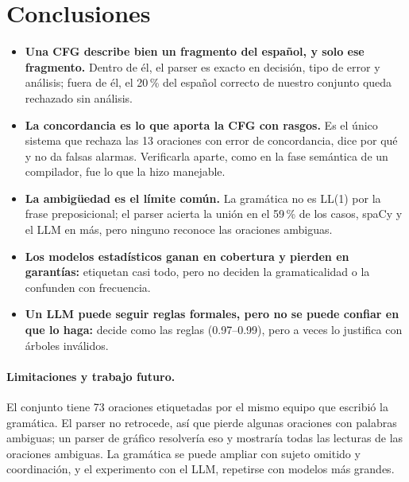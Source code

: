 \section{Conclusiones}
\label{sec:conclusiones}

\begin{itemize}
  \item \textbf{Una CFG describe bien un fragmento del español, y solo ese fragmento.} Dentro de
    él, el parser es exacto en decisión, tipo de error y análisis; fuera de él, el 20\,\% del
    español correcto de nuestro conjunto queda rechazado sin análisis.
  \item \textbf{La concordancia es lo que aporta la CFG con rasgos.} Es el único sistema que
    rechaza las 13 oraciones con error de concordancia, dice por qué y no da falsas alarmas.
    Verificarla aparte, como en la fase semántica de un compilador, fue lo que la hizo manejable.
  \item \textbf{La ambigüedad es el límite común.} La gramática no es LL(1) por la frase
    preposicional; el parser acierta la unión en el 59\,\% de los casos, spaCy y el LLM en más,
    pero ninguno reconoce las oraciones ambiguas.
  \item \textbf{Los modelos estadísticos ganan en cobertura y pierden en garantías:} etiquetan
    casi todo, pero no deciden la gramaticalidad o la confunden con frecuencia.
  \item \textbf{Un LLM puede seguir reglas formales, pero no se puede confiar en que lo haga:}
    decide como las reglas (0.97--0.99), pero a veces lo justifica con árboles inválidos.
\end{itemize}

\paragraph{Limitaciones y trabajo futuro.} El conjunto tiene 73 oraciones etiquetadas por el
mismo equipo que escribió la gramática. El parser no retrocede, así que pierde algunas
oraciones con palabras ambiguas; un parser de gráfico resolvería eso y mostraría todas las
lecturas de las oraciones ambiguas. La gramática se puede ampliar con sujeto omitido y
coordinación, y el experimento con el LLM, repetirse con modelos más grandes.
